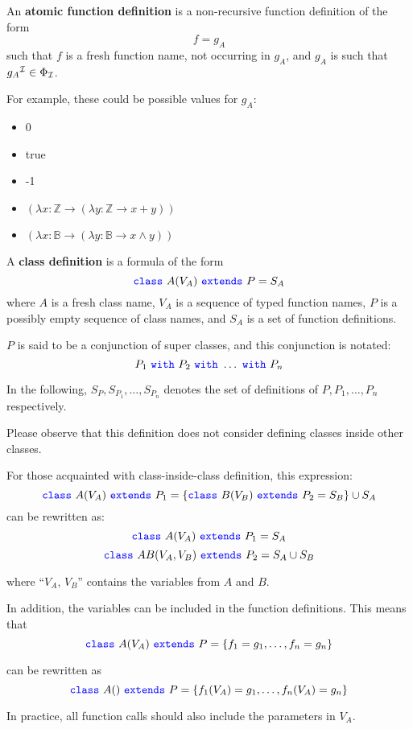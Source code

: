 An \textbf{atomic function definition} is a non-recursive function definition of the form
\[f = g_{A}\]
such that $f$ is a fresh function name, not occurring in $g_{A}$, and $g_{A}$ is such that ${g_{A}}^{\mathcal{I}} \in \Phi _{\mathcal{I}}$.

For example, these could be possible values for $g_{A}$:
\begin{itemize}
    \item 0
    \item true
    \item -1
    \item $(\lambda x: \mathbb{Z} \to (\lambda y: \mathbb{Z} \to x + y))$
    \item $(\lambda x: \mathbb{B} \to (\lambda y: \mathbb{B} \to x \land y) )$
\end{itemize}

A \textbf{class definition} is a formula of the form
\[{\color{blue}\texttt{{class}}}\ A (V_{A}) \ {\color{blue}\texttt{{extends}}}\ P = S_{A}\]
where $A$ is a fresh class name, $V_{A}$ is a sequence of typed function names, $P$ is a possibly empty sequence of class names, and $S_{A}$ is a set of function definitions.

$P$ is said to be a conjunction of super classes, and this conjunction is notated:
\[P_{1} \ \swith\ P_{2} \ \swith\ \ldots \ \swith\ P_{n}\]

In the following, $S_{P}, S_{P_{1}}, \ldots , S_{P_{n}}$ denotes the set of definitions of $P, P_{1}, \ldots, P_{n}$ respectively.

Please observe that this definition does not consider defining classes inside other classes.

For those acquainted with class-inside-class definition, this expression:
\[\sclass\ A (V_{A}) \ \sextends\ P_{1} = \{
\sclass\ B (V_{B}) \ \sextends\ P_{2} = S_{B} \} \cup S_{A}
\]
can be rewritten as:
\[\sclass\ A (V_{A}) \ \sextends\ P_{1} = S_{A}
\]
\[\sclass\ AB (V_{A}, V_{B}) \ \sextends\ P_{2} = S_{A} \cup S_{B}
\]

where ``$V_{A}$, $V_{B}$'' contains the variables from $A$ and $B$.

In addition, the variables can be included in the function definitions.
This means that
\[{\color{blue}\texttt{{class}}}\ A (V_{A}) \ {\color{blue}\texttt{{extends}}}\ P = \{
f_{1} = g_{1},
\ldots ,
f_{n} = g_{n}
\}
\]

can be rewritten as
\[\sclass\ A() \ \sextends\ P = \{
f_{1}(V_{A}) = g_{1},
\ldots ,
f_{n}(V_{A}) = g_{n}
\}
\]

In practice, all function calls should also include the parameters in $V_{A}$.

